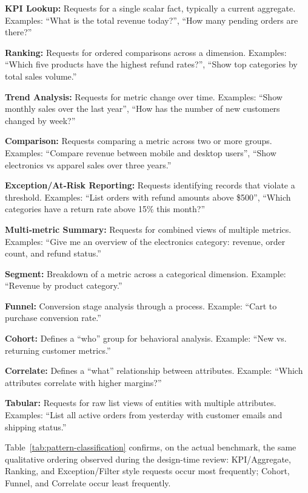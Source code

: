 \documentclass[11pt]{article}
\begin{document}
\noindent\textbf{KPI Lookup:} Requests for a single scalar fact, typically a current aggregate. Examples: ``What is the total revenue today?'', ``How many pending orders are there?''

\noindent\textbf{Ranking:} Requests for ordered comparisons across a dimension. Examples: ``Which five products have the highest refund rates?'', ``Show top categories by total sales volume.''

\noindent\textbf{Trend Analysis:} Requests for metric change over time. Examples: ``Show monthly sales over the last year'', ``How has the number of new customers changed by week?''

\noindent\textbf{Comparison:} Requests comparing a metric across two or more groups. Examples: ``Compare revenue between mobile and desktop users'', ``Show electronics vs apparel sales over three years.''

\noindent\textbf{Exception/At‑Risk Reporting:} Requests identifying records that violate a threshold. Examples: ``List orders with refund amounts above \$500'', ``Which categories have a return rate above 15\% this month?''

\noindent\textbf{Multi‑metric Summary:} Requests for combined views of multiple metrics. Examples: ``Give me an overview of the electronics category: revenue, order count, and refund status.''

\noindent\textbf{Segment:} Breakdown of a metric across a categorical dimension. Example: ``Revenue by product category.''

\noindent\textbf{Funnel:} Conversion stage analysis through a process. Example: ``Cart to purchase conversion rate.''

\noindent\textbf{Cohort:} Defines a ``who'' group for behavioral analysis. Example: ``New vs. returning customer metrics.''

\noindent\textbf{Correlate:} Defines a ``what'' relationship between attributes. Example: ``Which attributes correlate with higher margins?''

\noindent\textbf{Tabular:} Requests for raw list views of entities with multiple attributes. Examples: ``List all active orders from yesterday with customer emails and shipping status.''

Table~\ref{tab:pattern-classification} confirms, on the actual benchmark, the same qualitative ordering observed during the design-time review: KPI/Aggregate, Ranking, and Exception/Filter style requests occur most frequently; Cohort, Funnel, and Correlate occur least frequently.
\end{document}
